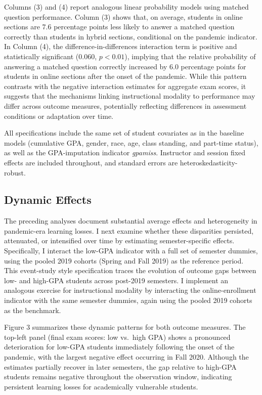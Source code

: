 \documentclass[
  12pt,
  letterpaper,
  DIV=11,
  numbers=noendperiod]{scrartcl}
\begin{document}
Columns (3) and (4) report analogous linear probability models using
matched question performance. Column (3) shows that, on average,
students in online sections are 7.6 percentage points less likely to
answer a matched question correctly than students in hybrid sections,
conditional on the pandemic indicator. In Column (4), the
difference-in-differences interaction term is positive and statistically
significant (\(0.060\), \(p < 0.01\)), implying that the relative
probability of answering a matched question correctly increased by 6.0
percentage points for students in online sections after the onset of the
pandemic. While this pattern contrasts with the negative interaction
estimates for aggregate exam scores, it suggests that the mechanisms
linking instructional modality to performance may differ across outcome
measures, potentially reflecting differences in assessment conditions or
adaptation over time.

All specifications include the same set of student covariates as in the
baseline models (cumulative GPA, gender, race, age, class standing, and
part-time status), as well as the GPA-imputation indicator
\emph{gpamiss}. Instructor and session fixed effects are included
throughout, and standard errors are heteroskedasticity-robust.

\subsection{Dynamic Effects}\label{dynamic-effects}

The preceding analyses document substantial average effects and
heterogeneity in pandemic-era learning losses. I next examine whether
these disparities persisted, attenuated, or intensified over time by
estimating semester-specific effects. Specifically, I interact the
low-GPA indicator with a full set of semester dummies, using the pooled
2019 cohorts (Spring and Fall 2019) as the reference period. This
event-study style specification traces the evolution of outcome gaps
between low- and high-GPA students across post-2019 semesters. I
implement an analogous exercise for instructional modality by
interacting the online-enrollment indicator with the same semester
dummies, again using the pooled 2019 cohorts as the benchmark.

Figure 3 summarizes these dynamic patterns for both outcome measures.
The top-left panel (final exam scores: low vs.~high GPA) shows a
pronounced deterioration for low-GPA students immediately following the
onset of the pandemic, with the largest negative effect occurring in
Fall 2020. Although the estimates partially recover in later semesters,
the gap relative to high-GPA students remains negative throughout the
observation window, indicating persistent learning losses for
academically vulnerable students.
\end{document}
